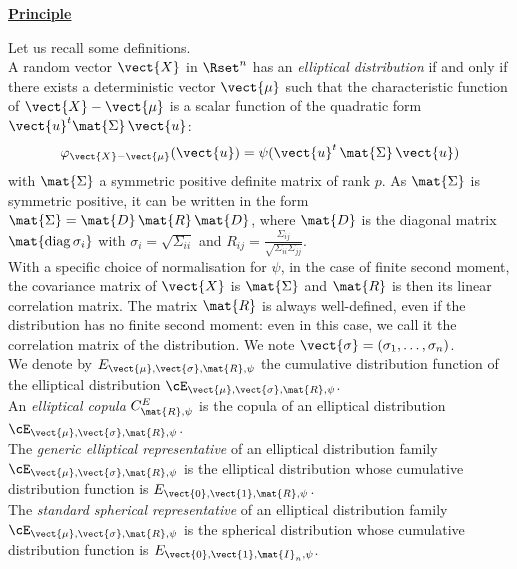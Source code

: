 {  \vspace{2mm}

  \underline{\textbf{Principle}} \vspace{2mm}

  Let us recall some definitions.\\

  A random vector $\vect{X}$ in $\Rset^n$ has an \emph{elliptical distribution} if and only if there exists a deterministic vector $\vect{\mu}$ such that the characteristic function of $\vect{X} - \vect{\mu}$ is a scalar function of the quadratic form $\vect{u}^t\mat{\Sigma}\, \vect{u}$:
  \begin{align*}
    \varphi_{\vect{X}-\vect{\mu}}(\vect{u})=\psi(\vect{u}^t\,\mat{\Sigma}\, \vect{u})
  \end{align*}
  with $\mat{\Sigma}$ a symmetric positive definite matrix of rank $p$. As $\mat{\Sigma}$ is symmetric positive, it can be written in the form $\mat{\Sigma}=\mat{D}\,\mat{R}\,\mat{D}$, where $\mat{D}$ is the diagonal matrix $\mat{\diag{\sigma_i}}$ with $\sigma_i=\sqrt{\Sigma_{ii}}$ and $R_{ij}=\frac{\Sigma_{ij}}{\sqrt{\Sigma_{ii}\Sigma_{jj}}}$.\\
  With a specific choice of normalisation for $\psi$, in the case of finite second moment, the covariance matrix of $\vect{X}$ is $\mat{\Sigma}$ and $\mat{R}$ is then its linear correlation matrix. The matrix $\mat{R}$ is always well-defined, even if the distribution has no finite second moment: even in this case, we call it the correlation matrix of the distribution. We note $\vect{\sigma}=(\sigma_1,\dots,\sigma_n)$.\\

  We denote by $E_{\vect{\mu},\vect{\sigma},\mat{R},\psi}$ the cumulative distribution function of the elliptical distribution $\cE_{\vect{\mu},\vect{\sigma}, \mat{R},\psi}$.\\

  An \emph{elliptical copula} $C^E_{\mat{R},\psi}$ is the copula of an elliptical distribution $\cE_{\vect{\mu},\vect{\sigma},\mat{R},\psi}$.\\

  The \emph{generic elliptical representative} of an elliptical distribution family $\cE_{\vect{\mu},\vect{\sigma},\mat{R},\psi}$ is the elliptical distribution whose cumulative distribution function is $E_{\vect{0},\vect{1},\mat{R},\psi}$.\\

  The \emph{standard spherical representative} of an elliptical distribution family $\cE_{\vect{\mu},\vect{\sigma},\mat{R},\psi}$ is the spherical distribution whose cumulative distribution function is $E_{\vect{0},\vect{1},\mat{I}_n,\psi}$.\\

}
